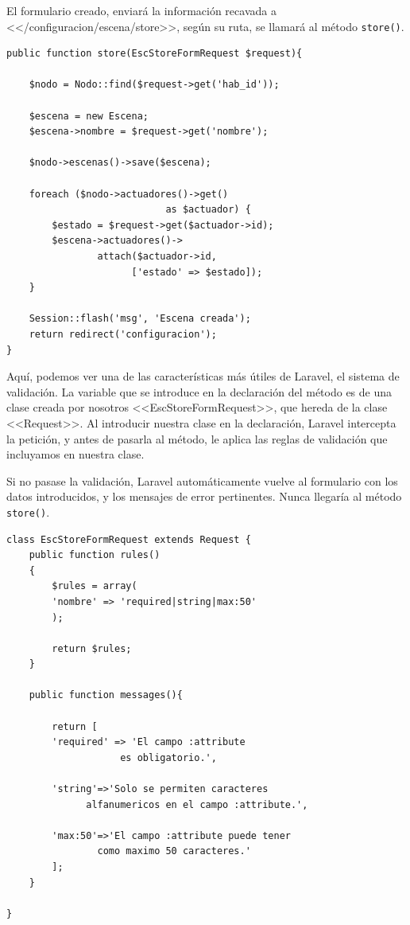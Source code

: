    El formulario creado, enviará la información recavada a <</configuracion/escena/store>>, según su ruta, se llamará al método \lstinline|store()|.
   
   \begin{lstlisting}
public function store(EscStoreFormRequest $request){

    $nodo = Nodo::find($request->get('hab_id'));
    
    $escena = new Escena;
    $escena->nombre = $request->get('nombre');
    
    $nodo->escenas()->save($escena);
    
    foreach ($nodo->actuadores()->get() 
                            as $actuador) {
        $estado = $request->get($actuador->id);
        $escena->actuadores()->
                attach($actuador->id, 
                      ['estado' => $estado]);
    }
  
    Session::flash('msg', 'Escena creada');
    return redirect('configuracion');
}
   \end{lstlisting}
   
   Aquí, podemos ver una de las características más útiles de Laravel, el sistema de validación. La variable que se introduce en la declaración del método es de una clase creada por nosotros <<EscStoreFormRequest>>, que hereda de la clase <<Request>>. Al introducir nuestra clase en la declaración, Laravel intercepta la petición, y antes de pasarla al método, le aplica las reglas de validación que incluyamos en nuestra clase. 
   
   Si no pasase la validación, Laravel automáticamente vuelve al formulario con los datos introducidos, y los mensajes de error pertinentes. Nunca llegaría al método \lstinline|store()|.
   
   \begin{lstlisting}
class EscStoreFormRequest extends Request {
    public function rules()
    {
        $rules = array(
        'nombre' => 'required|string|max:50'
        );
    
        return $rules;
    }
    
    public function messages(){
    
        return [
        'required' => 'El campo :attribute 
                    es obligatorio.',
        
        'string'=>'Solo se permiten caracteres 
              alfanumericos en el campo :attribute.',
                
        'max:50'=>'El campo :attribute puede tener 
                como maximo 50 caracteres.'
        ];
    }

}
    \end{lstlisting}
   
